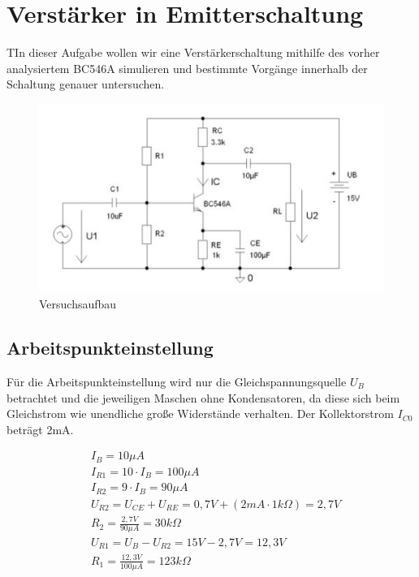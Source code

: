 \documentclass{article}
\begin{document}
\section{Verstärker in Emitterschaltung}

\begin{task}
  TIn dieser Aufgabe wollen wir eine Verstärkerschaltung mithilfe des vorher analysiertem BC546A simulieren und bestimmte Vorgänge innerhalb der Schaltung genauer untersuchen.
\end{task}

\begin{figure}[h]
  \centering
  \includegraphics{../assets/images/EL1P3/aufbau aufgabe2.jpg}
  \caption{Versuchsaufbau}
  \label{fig:schalt2}
\end{figure}


\subsection{Arbeitspunkteinstellung}
Für die Arbeitspunkteinstellung wird nur die Gleichspannungsquelle $U_B$ betrachtet und die jeweiligen Maschen ohne Kondensatoren, da diese sich beim Gleichstrom wie unendliche große Widerstände verhalten.
Der Kollektorstrom $I_{C0}$ beträgt 2mA.

\begin{align*}
  &I_B = 10\mu A\\  
  &I_{R1}=10\cdot I_B = 100\mu A\\
  &I_{R2}= 9\cdot I_B = 90\mu A\\
  &U_{R2} = U_{CE} + U_{RE} = 0,7V + (2mA\cdot 1k\Omega) = 2,7V\\
  &R_{2} = \frac{2,7V}{90\mu A} = 30k\Omega\\
  &U_{R1} = U_B - U_{R2} = 15V - 2,7V = 12,3V\\
  &R_{1} = \frac{12,3V}{100\mu A}=123k\Omega
\end{align*}
\end{document}
